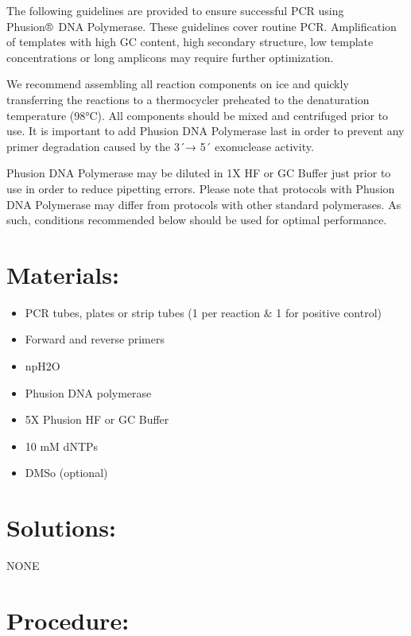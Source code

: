 \documentclass[
  letterpaper,
  DIV=11,
  numbers=noendperiod]{scrreprt}
\providecommand{\tightlist}{%
  \setlength{\itemsep}{0pt}\setlength{\parskip}{0pt}}\usepackage{longtable,booktabs,array}
\begin{document}
The following guidelines are provided to ensure successful PCR using
Phusion®~DNA Polymerase. These guidelines cover routine PCR.
Amplification of templates with high GC content, high secondary
structure, low template concentrations or long amplicons may require
further optimization.

We recommend assembling all reaction components on ice and quickly
transferring the reactions to a thermocycler preheated to the
denaturation temperature (98°C). All components should be mixed and
centrifuged prior to use. It is important to add Phusion DNA Polymerase
last in order to prevent any primer degradation caused by the 3´→ 5´
exonuclease activity.

Phusion DNA Polymerase may be diluted in 1X HF or GC Buffer just prior
to use in order to reduce pipetting errors. Please note that protocols
with Phusion DNA Polymerase may differ from protocols with other
standard polymerases. As such, conditions recommended below should be
used for optimal performance.

\hypertarget{materials-9}{%
\section{Materials:}\label{materials-9}}

\begin{itemize}
\tightlist
\item
  PCR tubes, plates or strip tubes (1 per reaction \& 1 for positive
  control)
\item
  Forward and reverse primers
\item
  npH2O
\item
  Phusion DNA polymerase
\item
  5X Phusion HF or GC Buffer
\item
  10 mM dNTPs
\item
  DMSo (optional)
\end{itemize}

\hypertarget{solutions-9}{%
\section{Solutions:}\label{solutions-9}}

NONE

\hypertarget{procedure-9}{%
\section{Procedure:}\label{procedure-9}}
\end{document}
